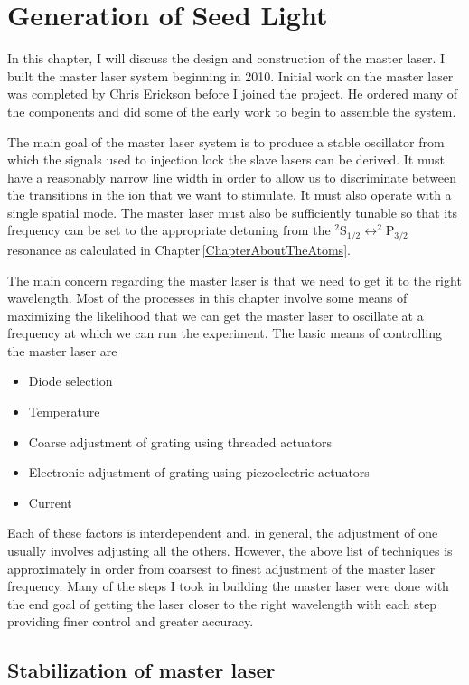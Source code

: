 \chapter{Generation of Seed Light}\label{generationOfSeedLight}

In this chapter, I will discuss the design and construction of the master laser. I built the master laser system beginning in 2010. Initial work on the master laser was completed by Chris Erickson before I joined the project. He ordered many of the components and did some of the early work to begin to assemble the system.

The main goal of the master laser system is to produce a stable oscillator from which the signals used to injection lock the slave lasers can be derived. It must have a reasonably narrow line width in order to allow us to discriminate between the transitions in the ion that we want to stimulate. It must also operate with a single spatial mode. The master laser must also be sufficiently tunable so that its frequency can be set to the appropriate detuning from the $^2$S$_{1/2}\leftrightarrow^2$P$_{3/2}$ resonance as calculated in Chapter\,\ref{ChapterAboutTheAtoms}.

The main concern regarding the master laser is that we need to get it to the right wavelength. Most of the processes in this chapter involve some means of maximizing the likelihood that we can get the master laser to oscillate at a frequency at which we can run the experiment. The basic means of controlling the master laser are
\begin{itemize}
\item Diode selection
\item Temperature 
\item Coarse adjustment of grating using threaded actuators
\item Electronic adjustment of grating using piezoelectric actuators
\item Current
\end{itemize}
Each of these factors is interdependent and, in general, the adjustment of one usually involves adjusting all the others. However, the above list of techniques is approximately in order from coarsest to finest adjustment of the master laser frequency. Many of the steps I took in building the master laser were done with the end goal of getting the laser closer to the right wavelength with each step providing finer control and greater accuracy.

\section{Stabilization of master laser}
